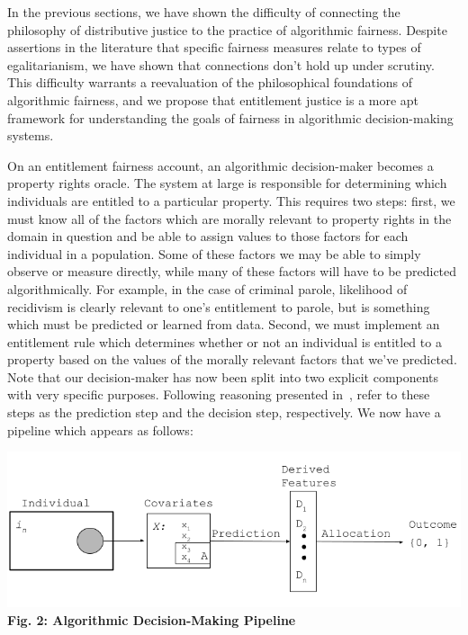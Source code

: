 In the previous sections, we have shown the difficulty of connecting the
philosophy of distributive justice to the practice of algorithmic fairness. 
Despite assertions in the literature that specific fairness measures relate to
types of egalitarianism, we have shown that connections don't hold up under
scrutiny. This difficulty warrants a reevaluation of the philosophical
foundations of algorithmic fairness, and we propose that entitlement justice is
a more apt framework for understanding the goals of fairness in algorithmic
decision-making systems.

On an entitlement fairness account, an algorithmic decision-maker becomes a
property rights oracle. The system at large is responsible for determining which
individuals are entitled to a particular property. This requires two steps:
first, we must know all of the factors which are morally relevant to property
rights in the domain in question and be able to assign values to those factors
for each individual in a population. Some of these factors we may be able to 
simply observe or measure directly, while many of these factors will have to be
predicted algorithmically. For example, in the case of criminal parole,
likelihood of recidivism is clearly relevant to one's entitlement to parole, but
is something which must be predicted or learned from data. Second, we must
implement an entitlement rule which determines whether or not an individual is
entitled to a property based on the values of the morally relevant factors that
we've predicted. Note that our decision-maker has now been split into two
explicit components with very specific purposes. Following reasoning presented
in~\cite{Kuppler_2021}, refer to these steps as the prediction step and the
decision step, respectively. We now have a pipeline which appears as follows:

\begin{center}
    \includegraphics[scale=0.5]{figs/fig2.png}\\
    \textbf{Fig. 2: Algorithmic Decision-Making Pipeline}
\end{center}

